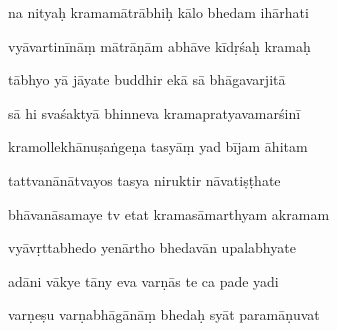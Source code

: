 \documentclass[article,12pt,a4paper]{memoir}%
\newcounter{parCount}
\begin{document}
	  
	  \pstart {} na nityaḥ kramamātrābhiḥ kālo bhedam ihārhati 
	{}
	\pend%
      

	  
	  \pstart \leavevmode%
	vyāvartinīnāṃ mātrāṇām abhāve kīdṛśaḥ kramaḥ 
	{}
	\pend%
      

	  
	  \pstart {} tābhyo yā jāyate buddhir ekā sā bhāgavarjitā 
	{}
	\pend%
      

	  
	  \pstart \leavevmode%
	sā hi svaśaktyā bhinneva kramapratyavamarśinī 
	{}
	\pend%
      

	  
	  \pstart {} kramollekhānuṣaṅgeṇa tasyāṃ yad bījam āhitam 
	{}
	\pend%
      

	  
	  \pstart \leavevmode%
	tattvanānātvayos tasya niruktir nāvatiṣṭhate 
	{}
	\pend%
      

	  
	  \pstart {} bhāvanāsamaye tv etat kramasāmarthyam akramam 
	{}
	\pend%
      

	  
	  \pstart \leavevmode%
	vyāvṛttabhedo yenārtho bhedavān upalabhyate 
	{}
	\pend%
      

	  
	  \pstart {} adāni vākye tāny eva varṇās te ca pade yadi 
	{}
	\pend%
      

	  
	  \pstart \leavevmode%
	varṇeṣu varṇabhāgānāṃ bhedaḥ syāt paramāṇuvat 
	{}
	\pend%
      
\end{document}
